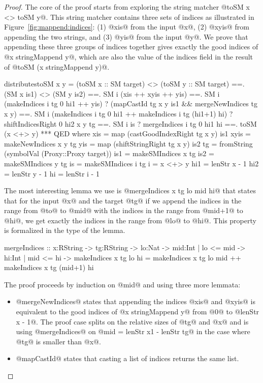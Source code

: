 \begin{proof}
The core of the proof starts from
exploring the string matcher @toSM x <> toSM y@.
%
This string matcher contains three sets of indices
as illustrated in Figure~\ref{fig:mappend:indices}:
(1) @xis@ from the input @x@,
(2) @xyis@ from appending the two strings, and
(3) @yis@ from the input @y@.
%
We prove that appending these three groups of indices together gives
exactly the good indices of @x stringMappend y@, which are also the
value of the indices field in the result of
%
@toSM (x stringMappend y)@.
\begin{code}
distributestoSM x y
  =   (toSM x :: SM target) <> (toSM y :: SM target)
  ==. (SM x is1) <> (SM y is2)
  ==. SM i (xis ++ xyis ++ yis)
  ==. SM i (makeIndices i tg 0 hi1 ++ yis)
      ? (mapCastId tg x y is1 && mergeNewIndices tg x y)
  ==. SM i (makeIndices i tg 0       hi1
         ++ makeIndices i tg (hi1+1) hi)
      ? shiftIndicesRight 0 hi2 x y tg
  ==. SM i is
      ? mergeIndices i tg 0 hi1 hi
  ==. toSM (x <+> y)
  *** QED
  where
    xis  = map (castGoodIndexRight tg x y) is1
    xyis = makeNewIndices x y tg
    yis  = map (shiftStringRight   tg x y) is2
    tg   = fromString (symbolVal (Proxy::Proxy target))
    is1  = makeSMIndices x tg
    is2  = makeSMIndices y tg
    is   = makeSMIndices i tg
    i    = x <+> y
    hi1  = lenStr x - 1
    hi2  = lenStr y - 1
    hi   = lenStr i - 1
\end{code}
%
The most interesting lemma we use is
@mergeIndices x tg lo mid hi@
that states that for the input @x@ and the target @tg@
if we append the indices in the range  from @to@ to @mid@
with the indices in the range from @mid+1@ to @hi@,
we get exactly the indices in the range from @lo@ to @hi@.
%
This property is formalized in the type of the lemma.
\begin{code}
mergeIndices
 :: x:RString -> tg:RString
  -> lo:Nat -> mid:{Int | lo <= mid} -> hi:{Int | mid <= hi}
  -> {   makeIndices x tg lo hi
     =  makeIndices x tg lo mid
     ++ makeIndices x tg (mid+1) hi}
\end{code}
%
The proof proceeds by induction on @mid@ and using three more lemmata:
\begin{itemize}
\item @mergeNewIndices@ states that appending the indices @xis@ and @xyis@
is equivalent to the good indices of @x stringMappend y@ from @0@ to @lenStr x - 1@.
%
The proof case splits on the relative sizes of @tg@ and @x@
and is using @mergeIndices@ on @mid = lenStr x1 - lenStr tg@
in the case where @tg@ is smaller than @x@.
%
\item @mapCastId@ states that casting a list of indices returns the same list.

\end{itemize}
\end{proof}
